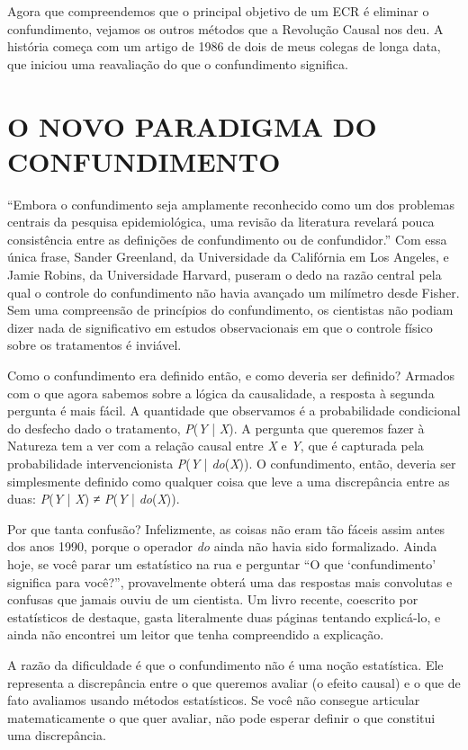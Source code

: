 \documentclass[11pt,a5paper,twoside]{book}
\begin{document}
Agora que compreendemos que o principal objetivo de um ECR é eliminar o confundimento, vejamos os outros métodos que a Revolução Causal nos deu. A história começa com um artigo de 1986 de dois de meus colegas de longa data, que iniciou uma reavaliação do que o confundimento significa.

\section{O NOVO PARADIGMA DO CONFUNDIMENTO}
“Embora o confundimento seja amplamente reconhecido como um dos problemas centrais da pesquisa epidemiológica, uma revisão da literatura revelará pouca consistência entre as definições de confundimento ou de confundidor.” Com essa única frase, Sander Greenland, da Universidade da Califórnia em Los Angeles, e Jamie Robins, da Universidade Harvard, puseram o dedo na razão central pela qual o controle do confundimento não havia avançado um milímetro desde Fisher. Sem uma compreensão de princípios do confundimento, os cientistas não podiam dizer nada de significativo em estudos observacionais em que o controle físico sobre os tratamentos é inviável.

Como o confundimento era definido então, e como deveria ser definido? Armados com o que agora sabemos sobre a lógica da causalidade, a resposta à segunda pergunta é mais fácil. A quantidade que observamos é a probabilidade condicional do desfecho dado o tratamento, \textit{P}(\textit{Y} | \textit{X}). A pergunta que queremos fazer à Natureza tem a ver com a relação causal entre \textit{X} e \textit{Y}, que é capturada pela probabilidade intervencionista \textit{P}(\textit{Y} | \textit{do}(\textit{X})). O confundimento, então, deveria ser simplesmente definido como qualquer coisa que leve a uma discrepância entre as duas: \textit{P}(\textit{Y} | \textit{X}) ≠ \textit{P}(\textit{Y} | \textit{do}(\textit{X})).

Por que tanta confusão? Infelizmente, as coisas não eram tão fáceis assim antes dos anos 1990, porque o operador \textit{do} ainda não havia sido formalizado. Ainda hoje, se você parar um estatístico na rua e perguntar “O que ‘confundimento’ significa para você?”, provavelmente obterá uma das respostas mais convolutas e confusas que jamais ouviu de um cientista. Um livro recente, coescrito por estatísticos de destaque, gasta literalmente duas páginas tentando explicá-lo, e ainda não encontrei um leitor que tenha compreendido a explicação.

A razão da dificuldade é que o confundimento não é uma noção estatística. Ele representa a discrepância entre o que queremos avaliar (o efeito causal) e o que de fato avaliamos usando métodos estatísticos. Se você não consegue articular matematicamente o que quer avaliar, não pode esperar definir o que constitui uma discrepância.
\end{document}
